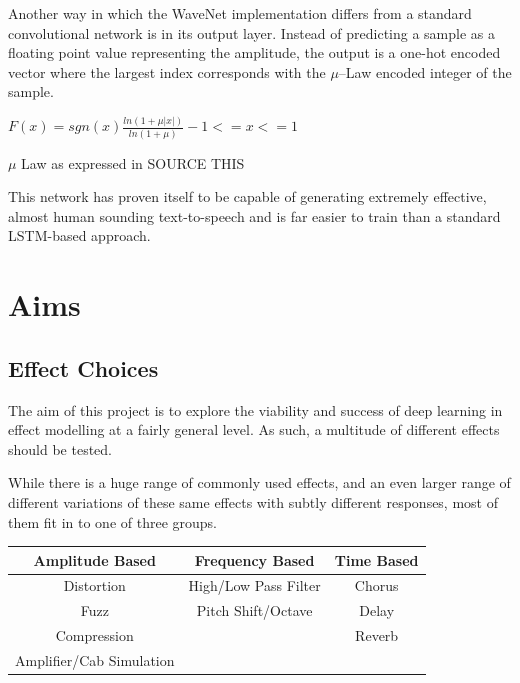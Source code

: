 \documentclass{l4proj}
\begin{document}
Another way in which the WaveNet implementation differs from a standard
convolutional network is in its output layer. Instead of predicting a
sample as a floating point value representing the amplitude, the output
is a one-hot encoded vector where the largest index corresponds with the
\(\mu\)--Law encoded integer of the sample.

\begin{center}

    $F(x) = sgn(x)\frac{ln(1+\mu|x|)}{ln(1+\mu)} -1 <= x <= 1$

    $\mu$ Law as expressed in \LARGE{SOURCE THIS}
\end{center}

This network has proven itself to be capable of generating extremely
effective, almost human sounding text-to-speech and is far easier to
train than a standard LSTM-based approach.

\hypertarget{aims}{%
\chapter{Aims}\label{aims}}

\hypertarget{effect-choices}{%
\section{Effect Choices}\label{effect-choices}}

The aim of this project is to explore the viability and success of deep
learning in effect modelling at a fairly general level. As such, a
multitude of different effects should be tested.

While there is a huge range of commonly used effects, and an even larger
range of different variations of these same effects with subtly
different responses, most of them fit in to one of three groups.

\begin{center}
\begin{tabular}{ |c|c|c| } 
 \hline
    \textbf{Amplitude Based} & \textbf{Frequency Based} & \textbf{Time Based} \\ 
 \hline
 Distortion & High/Low Pass Filter & Chorus \\ 
 Fuzz & Pitch Shift/Octave & Delay \\ 
 Compression & & Reverb \\ 
 Amplifier/Cab Simulation & & \\ 
 \hline
\end{tabular}
\end{center}
\end{document}
